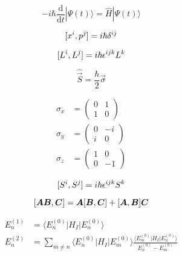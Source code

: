 \begin{equation*}
    -i \hbar \frac{\mathrm{d}}{\mathrm{d}t} |\Psi(t)\rangle = \hat{H} |\Psi(t) \rangle
\end{equation*}

\begin{equation*}
    [x^{i},p^{j}] = i \hbar \delta^{ij}
\end{equation*}

\begin{equation*}
    [L^{i},L^{j}] = i\hbar \epsilon^{ijk}L^{k}
\end{equation*}

\begin{equation*}
    \hat{\vec{S}} = \frac{\hbar}{2} \vec{\sigma}
\end{equation*}

\begin{align*}
    \sigma_{x} &=
    \begin{pmatrix}
        0 & 1 \\
        1 & 0
    \end{pmatrix} \\
    \sigma_{y} &=
    \begin{pmatrix}
        0 & -i \\
        i & 0
    \end{pmatrix} \\
    \sigma_{z} &=
    \begin{pmatrix}
        1 & 0 \\
        0 & -1
    \end{pmatrix}
\end{align*}

\begin{equation*}
    [S^{i},S^{j}] = i\hbar \epsilon^{ijk}S^{k}
\end{equation*}

\begin{equation*}
    [\boldsymbol{A} \boldsymbol{B},\boldsymbol{C}] = \boldsymbol{A}[\boldsymbol{B},\boldsymbol{C}] + [\boldsymbol{A},\boldsymbol{B}]\boldsymbol{C}
\end{equation*}

\begin{align*}
    E_{n}^{(1)} &= \langle E_{n}^{(0)} | H_{I} | E_{n}^{(0)} \rangle \\
    E_{n}^{(2)} &= \sum_{m \neq n} \langle E_{n}^{(0)} | H_{I} | E_{m}^{(0)} \rangle \frac{\langle E_{m}^{(0)} | H_{I} | E_{n}^{(0)} \rangle}{E_{n}^{(0)} - E_{m}^{(0)}} \\
\end{align*}
